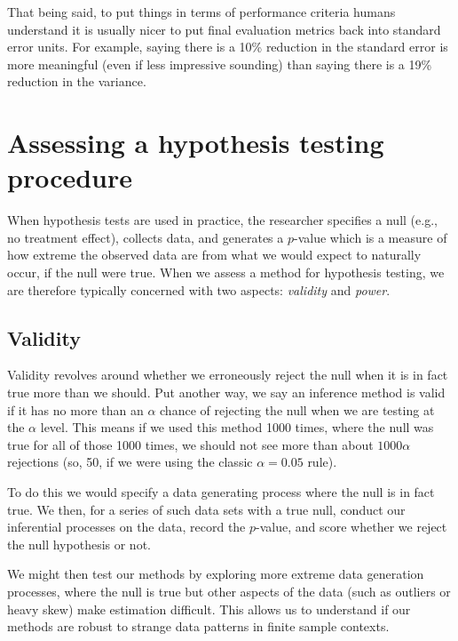 \documentclass[
]{book}
\begin{document}
That being said, to put things in terms of performance criteria humans understand it is usually nicer to put final evaluation metrics back into standard error units.
For example, saying there is a 10\% reduction in the standard error is more meaningful (even if less impressive sounding) than saying there is a 19\% reduction in the variance.

\hypertarget{assessing-a-hypothesis-testing-procedure}{%
\section{Assessing a hypothesis testing procedure}\label{assessing-a-hypothesis-testing-procedure}}

When hypothesis tests are used in practice, the researcher specifies a null (e.g., no treatment effect), collects data, and generates a \(p\)-value which is a measure of how extreme the observed data are from what we would expect to naturally occur, if the null were true.
When we assess a method for hypothesis testing, we are therefore typically concerned with two aspects: \emph{validity} and \emph{power}.

\hypertarget{validity}{%
\subsection{Validity}\label{validity}}

Validity revolves around whether we erroneously reject the null when it is in fact true more than we should.
Put another way, we say an inference method is valid if it has no more than an \(\alpha\) chance of rejecting the null when we are testing at the \(\alpha\) level.
This means if we used this method 1000 times, where the null was true for all of those 1000 times, we should not see more than about \(1000 \alpha\) rejections (so, 50, if we were using the classic \(\alpha = 0.05\) rule).

To do this we would specify a data generating process where the null is in fact true.
We then, for a series of such data sets with a true null, conduct our inferential processes on the data, record the \(p\)-value, and score whether we reject the null hypothesis or not.

We might then test our methods by exploring more extreme data generation processes, where the null is true but other aspects of the data (such as outliers or heavy skew) make estimation difficult.
This allows us to understand if our methods are robust to strange data patterns in finite sample contexts.
\end{document}
